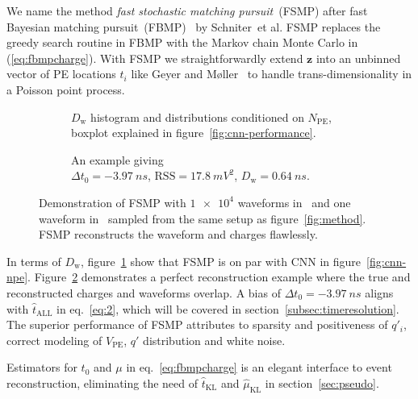 We name the method \emph{fast stochastic matching pursuit}~(FSMP) after fast Bayesian matching pursuit~(FBMP)~\cite{schniter_fast_2008} by Schniter~et al.  FSMP replaces the greedy search routine in FBMP with the Markov chain Monte Carlo in (\ref{eq:fbmpcharge}).  With FSMP we straightforwardly extend $\bm{z}$ into an unbinned vector of PE locations $t_i$ like Geyer and Møller~\cite{geyer_simulation_1994} to handle trans-dimensionality in a Poisson point process.

\begin{figure}[H]
  \begin{subfigure}[b]{.45\textwidth}
    \centering
    \resizebox{1.05\textwidth}{!}{}
    \caption{\label{fig:fbmp-npe} $D_\mathrm{w}$ histogram and distributions conditioned on $N_{\mathrm{PE}}$, boxplot explained in figure~\ref{fig:cnn-performance}.}
  \end{subfigure}
  \hspace{0.5em}
  \begin{subfigure}[b]{.55\textwidth}
    \centering
    \resizebox{\textwidth}{!}{}
    \caption{\label{fig:fbmp} An example giving \\ $\Delta{t_0}=\SI{-3.97}{ns}$, $\mathrm{RSS}=\SI{17.8}{mV^2}$, $D_\mathrm{w}=\SI{0.64}{ns}$.}
  \end{subfigure}
  \caption{\label{fig:fbmp-performance}Demonstration of FSMP with $\num[retain-unity-mantissa=false]{1e4}$ waveforms in~ and one waveform in~ sampled from the same setup as figure~\ref{fig:method}.  FSMP reconstructs the waveform and charges flawlessly.}
\end{figure}
In terms of $D_\mathrm{w}$, figure~\ref{fig:fbmp-npe} show that FSMP is on par with CNN in figure~\ref{fig:cnn-npe}.  Figure~\ref{fig:fbmp} demonstrates a perfect reconstruction example where the true and reconstructed charges and waveforms overlap.  A bias of $\Delta{t_0}=\SI{-3.97}{ns}$ aligns with $\hat{t}_\mathrm{ALL}$ in eq.~\eqref{eq:2}, which will be covered in section~\ref{subsec:timeresolution}.  The superior performance of FSMP attributes to sparsity and positiveness of $q'_i$, correct modeling of $V_\mathrm{PE}$, $q'$ distribution and white noise.

Estimators for $t_0$ and $\mu$ in eq.~\eqref{eq:fbmpcharge} is an elegant interface to event reconstruction, eliminating the need of $\hat{t}_\mathrm{KL}$ and $\hat{\mu}_\mathrm{KL}$ in section~\ref{sec:pseudo}.
